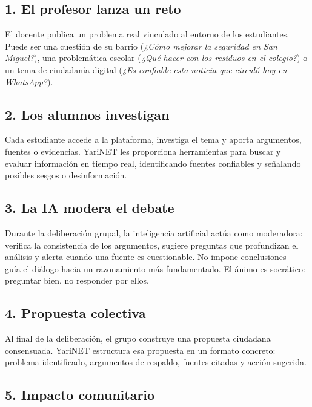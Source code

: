 \documentclass[a4paper, 11pt]{article}
\begin{document}
\subsection{1. El profesor lanza un reto}

El docente publica un problema real vinculado al entorno de los estudiantes.
Puede ser una cuesti\'{o}n de su barrio (\textit{¿C\'{o}mo mejorar la seguridad
en San Miguel?}), una problem\'{a}tica escolar (\textit{¿Qu\'{e} hacer con los
residuos en el colegio?}) o un tema de ciudadan\'{i}a digital (\textit{¿Es
confiable esta noticia que circul\'{o} hoy en WhatsApp?}).

\subsection{2. Los alumnos investigan}

Cada estudiante accede a la plataforma, investiga el tema y aporta argumentos,
fuentes o evidencias. YariNET les proporciona herramientas para buscar y
evaluar informaci\'{o}n en tiempo real, identificando fuentes confiables
y señalando posibles sesgos o desinformaci\'{o}n.

\subsection{3. La IA modera el debate}

Durante la deliberaci\'{o}n grupal, la inteligencia artificial act\'{u}a como
moderadora: verifica la consistencia de los argumentos, sugiere preguntas
que profundizan el an\'{a}lisis y alerta cuando una fuente es cuestionable.
No impone conclusiones --- guía el di\'{a}logo hacia un razonamiento m\'{a}s
fundamentado. El \'{a}nimo es socr\'{a}tico: preguntar bien, no responder por ellos.

\subsection{4. Propuesta colectiva}

Al final de la deliberaci\'{o}n, el grupo construye una propuesta ciudadana
consensuada. YariNET estructura esa propuesta en un formato concreto:
problema identificado, argumentos de respaldo, fuentes citadas y
acci\'{o}n sugerida.

\subsection{5. Impacto comunitario}
\end{document}
